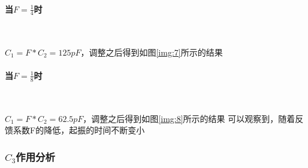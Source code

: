 \documentclass[UTF8]{ctexart}
\begin{document}
\paragraph{当$F=\frac{1}{4}$时}~{}\par
$C_1=F*C_2=125pF$，调整之后得到如图\ref{img:7}所示的结果
\paragraph{当$F=\frac{1}{8}$时}~{}\par
$C_1=F*C_2=62.5pF$，调整之后得到如图\ref{img:8}所示的结果
可以观察到，随着反馈系数F的降低，起振的时间不断变小
\subsubsection{$C_3$作用分析}
\end{document}
